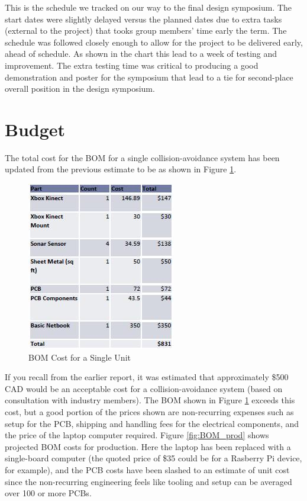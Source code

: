 \documentclass[oneside,final,a4paper]{report}
\begin{document}
This is the schedule we tracked on our way to the final design symposium. The start dates were slightly delayed versus the planned dates due to extra tasks (external to the project) that tooks group members' time early the term. The schedule was followed closely enough to allow for the project to be delivered early, ahead of schedule. As shown in the chart this lead to a week of testing and improvement. The extra testing time was critical to producing a good demonstration and poster for the symposium that lead to a tie for second-place overall position in the design symposium.

\section{Budget}
The total cost for the BOM for a single collision-avoidance system has been updated from the previous estimate to be as shown in Figure \ref{fig:BOM_single}.

\begin{figure}[hbt]
 \centering
 \includegraphics[scale=0.8]{BOM_single}
 \caption{BOM Cost for a Single Unit}
 \label{fig:BOM_single}
\end{figure}

If you recall from the earlier report, it was estimated that approximately \$500 CAD would be an acceptable cost for a collision-avoidance system (based on consultation with industry members). The BOM shown in Figure \ref{fig:BOM_single} exceeds this cost, but a good portion of the prices shown are non-recurring expenses such as setup for the PCB, shipping and handling fees for the electrical components, and the price of the laptop computer required. Figure \ref{fig:BOM_prod} shows  projected BOM costs for production. Here the laptop has been replaced with a single-board computer (the quoted price of \$35 could be for a Rasberry Pi device, for example), and the PCB costs have been slashed to an estimate of unit cost since the non-recurring engineering feels like tooling and setup can be averaged over 100 or more PCBs.
\end{document}
